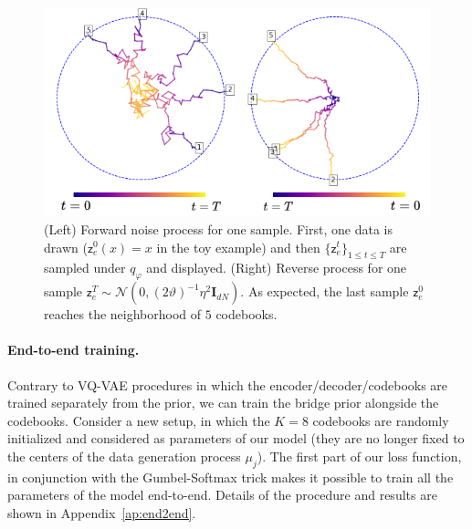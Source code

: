 \documentclass[nohyperref]{article}
\theoremstyle{plain}
\theoremstyle{definition}
\theoremstyle{remark}
\newcommand{\latentcont}{\mathsf{z}_e}
\begin{document}
\begin{figure}[h!]
    \centering
    \includegraphics[scale=0.4]{images/noisedenoise2.png}
    \caption{(Left) Forward noise process for one sample. First, one data is drawn ($\latentcont^0(x) =x$ in the toy example)  and then $\{\latentcont^t\}_{1\leq t \leq T}$ are sampled under $q_\varphi$ and displayed. %
    (Right) Reverse process for one sample $\latentcont^T\sim  \mathcal{N}(0, (2\vartheta)^{-1}\eta^2 \mathbf{I}_{dN})$. As expected, the last sample $\latentcont^0$ reaches the neighborhood of $5$ codebooks.}
    \label{fig:noisedenoise}
\end{figure}

 
\paragraph{End-to-end training. } Contrary to VQ-VAE procedures in which the encoder/decoder/codebooks are trained separately from the prior, we can train the bridge prior alongside the codebooks. Consider a new setup, in which the $K=8$ codebooks are randomly initialized and considered as parameters of our model (they are no longer fixed to the centers of the data generation process $\mu_j$). The first part of our loss function, in conjunction with the Gumbel-Softmax trick makes it possible to train all the parameters of the model end-to-end. Details of the procedure and results are shown in Appendix~\ref{ap:end2end}.
\end{document}
